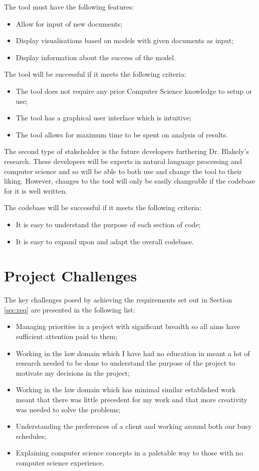 			The tool must have the following features: 
			\begin{itemize}
				\item Allow for input of new documents;
				\item Display visualisations based on models with given documents as input;
				\item Display information about the success of the model.
			\end{itemize}

			The tool will be successful if it meets the following criteria: 
			\begin{itemize}
				\item The tool does not require any prior Computer Science knowledge to setup or use;
				\item The tool has a graphical user interface which is intuitive; 
				\item The tool allows for maximum time to be spent on analysis of results.
			\end{itemize}
			
			The second type of stakeholder is the future developers furthering Dr. Blakely's research. These developers will be experts in natural language processing and computer science and so will be able to both use and change the tool to their liking. However, changes to the tool will only be easily changeable if the codebase for it is well written. 

			The codebase will be successful if it meets the following criteria:
			\begin{itemize}
				\item It is easy to understand the purpose of each section of code;
				\item It is easy to expand upon and adapt the overall codebase.
			\end{itemize}

		\section{Project Challenges}
			The key challenges posed by achieving the requirements set out in Section \ref{sec:req} are presented in the following list:
			\begin{itemize}
				\item Managing priorities in a project with significant breadth so all aims have sufficient attention paid to them;
				\item Working in the law domain which I have had no education in meant a lot of research needed to be done to understand the purpose of the project to motivate my decisions in the project;
				\item Working in the law domain which has minimal similar established work meant that there was little precedent for my work and that more creativity was needed to solve the problems;
				\item Understanding the preferences of a client and working around both our busy schedules;
				\item Explaining computer science concepts in a paletable way to those with no computer science experience.
			\end{itemize}

